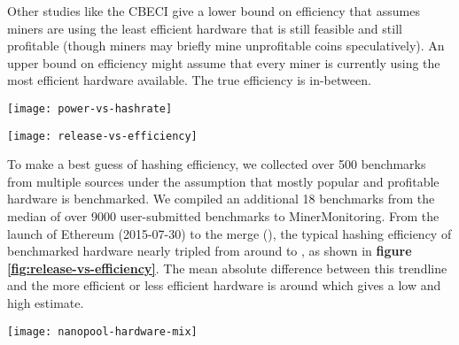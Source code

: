 Other studies like the CBECI give a lower bound on efficiency that assumes miners are using the least efficient hardware that is still feasible and still profitable (though miners may briefly mine unprofitable coins speculatively). An upper bound on efficiency might assume that every miner is currently using the most efficient hardware available. The true efficiency is in-between.

\begin{figure*}[htp]
    \centering
    \texttt{[image: power-vs-hashrate]}
    \caption{GPU power usage vs hashrate reported by users on MinerMonitoring, showing large variation across the same GPU models.}
    \label{fig:power-vs-hashrate}
\end{figure*}

\begin{figure*}[htp]
    \centering
    \texttt{[image: release-vs-efficiency]}
    \caption{Plot of hardware hashing efficiency increasing over time, with hardware names drawn next to the median efficiency across multiple benchmarks.}
    \label{fig:release-vs-efficiency}
\end{figure*}

To make a best guess of hashing efficiency, we collected over 500 benchmarks from multiple sources under the assumption that mostly popular and profitable hardware is benchmarked. We compiled an additional 18 benchmarks from the median of over 9000 user-submitted benchmarks to MinerMonitoring\cite{minermonitoring_gpu_2021}. From the launch of Ethereum (2015-07-30) to the merge (), the typical hashing efficiency of benchmarked hardware nearly tripled from around  to , as shown in \textbf{figure \ref{fig:release-vs-efficiency}}. The mean absolute difference between this trendline and the more efficient or less efficient hardware is around  which gives a low and high estimate.

\begin{figure*}[htp]
    \centering
    \texttt{[image: nanopool-hardware-mix]}
    \caption{Total hashrate of active workers on Nanopool that match one of 28 common hardware terms, over multiple days during 2021-10 through 2021-11.}
    \label{fig:nanopool-hardware-mix}
\end{figure*}

